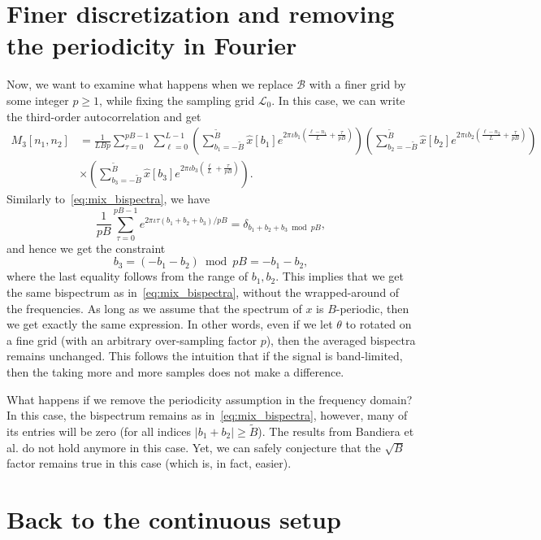\documentclass[english,12pt]{article}
\newcommand{\I}{\iota}
\newcommand{\tB}{\tilde{B}}
\begin{document}
\section{Finer discretization and removing the periodicity in Fourier}

Now, we want to examine what happens when we replace $\mathcal{B}$ with a finer grid by some integer $p\geq 1$, while fixing the sampling grid $\mathcal{L}_0$. 
In this case, we can write  the third-order autocorrelation and get 
\begin{equation}
\begin{split}
M_3[n_1,n_2] 
&= \frac{1}{LBp}\sum_{\tau=0}^{pB-1}\sum_{\ell=0}^{L-1} 
\left(\sum_{b_1=-\tB}^{\tB}\hat{x}[b_1]e^{2\pi\I b_1 \left(\frac{\ell-n_1}{L} + \frac{\tau}{pB}\right) }\right) 
\left(\sum_{b_2=-\tB}^{\tB}\hat{x}[b_2]e^{2\pi\I b_2 \left(\frac{\ell-n_2}{L} + \frac{\tau}{pB}\right) } \right) \\
&\times \left(\sum_{b_3=-\tB}^{\tB}\hat{x}[b_3]e^{2\pi\I b_3 \left(\frac{\ell}{L} + \frac{\tau}{pB}\right) }\right). 
\end{split}
\end{equation}
Similarly to~\eqref{eq:mix_bispectra}, we have
\begin{equation} \label{eq:sum2}
\frac{1}{pB}\sum_{\tau=0}^{pB-1}e^{2\pi\I\tau (b_1+b_2+b_3)/pB} = \delta_{b_1+b_2+b_3\bmod pB},
\end{equation}
and hence we get the constraint $$b_3=(-b_1-b_2)\bmod pB=-b_1-b_2,$$
where the last equality follows from the range of $b_1,b_2$.
This implies that we get the same bispectrum as in~\eqref{eq:mix_bispectra}, without the wrapped-around of the frequencies. As long as we assume that the spectrum of $x$ is $B$-periodic, then we get exactly the same expression. 
In other words, even if we let $\theta$ to rotated on a fine grid (with an arbitrary over-sampling factor $p$), then the averaged bispectra remains unchanged.
This follows the intuition that if the signal is band-limited, then the taking more and more samples does not make a difference. 

What happens if we remove the periodicity assumption in the frequency domain? In this case, the bispectrum remains as in~\eqref{eq:mix_bispectra}, however, many of its entries will be zero (for all indices $\vert b_1+b_2\vert \geq \tB$). The results from Bandiera et al. do not hold anymore in this case. Yet, we can safely conjecture that the $\sqrt{B}$ factor remains true in this case (which is, in fact, easier).  


\section{Back to the continuous setup}
\end{document}

